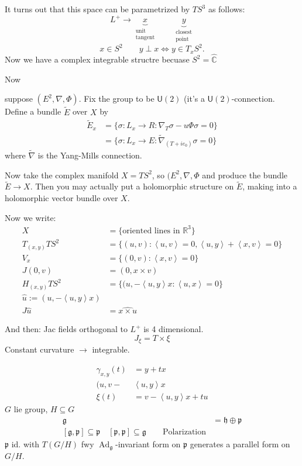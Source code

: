 It turns out that this space can be parametrized by \(TS^3\) as follows:
\[L^+ \to \underbrace{x}_{\substack{\text{unit}  \\ \text{tangent} } }\qquad \underbrace{y}_{\substack{\text{closest}  \\ \text{point} }}\]
\[x \in S^2\qquad y \perp x \iff y \in T_x S^2.\]
Now we have a complex integrable structre becuase \(S^2=\hat{\mathbb{C}}\)

Now

suppose \((E^2, \nabla, \Phi)\). Fix the group to be  \(\mathsf{U}(2)\) (it's a \(\mathsf{U}(2)\)-connection. Define a bundle \(\tilde{E}\) over \(X\) by
\begin{align*}
\tilde{E}_x&= \{ \sigma: L_x \to R: \nabla_T\sigma - u\Phi \sigma=0\}\\
&=\{\sigma:L_x \to E: \tilde{\nabla}_{(T+i e_0)}\sigma=0\}
\end{align*}
where \(\tilde{\nabla}\) is the Yang-Mills connection.

Now take the complex manifold \(X= TS^2\), so \((E^2,\nabla,\Phi\) and produce the bundle \(\tilde{ E} \to X\). Then you may actually put a holomorphic structure on \(\tilde{E}\), making into a holomorphic vector bundle over \(X\).

Now we write:
\begin{align*}
X&=\{\text{oriented lines in \(\mathbb{R}^3\)} \}\\
T_{(x,y)}TS^2&=\{(u,v): \left< u,v\right>=0, \left<u,y\right>+\left<x,v\right>=0\}\\
V_x&=\{(0,v) : \left<x,v\right>=0\}\\
J(0,v)&=(0,x \times v)\\
H_{(x,y)}TS^2&=\{(u,-\left<u,y\right>x:\left<u,x\right>=0\}\\
\hat{u}:=(u,-\left<u,y\right>x)\\
J\hat{u}&=\widehat{x \times u}
\end{align*}

And then: Jac fields orthogonal to \(L^+\) is 4 dimensional.
\[J_{\xi}=T \times \xi\]
Constant curvature \(\to \) integrable.

\begin{align*}
\gamma_{x,y}(t)&=y+t x\\
(u,v-&\left<u,y\right>x\\
\xi(t)&=v-\left<u,y\right>x+tu
\end{align*}
\(G\) lie group, \(H\subseteq G\)
\begin{align*}
\mathfrak{g}&=\mathfrak{h} \oplus  \mathfrak{p}\\
[\mathfrak{g},\mathfrak{p}] \subseteq \mathfrak{p}\quad [\mathfrak{p},\mathfrak{p}] \subseteq \mathfrak{g}\qquad \text{Polarization}
\end{align*}
\(\mathfrak{p}\) id. with \(T(G/H)\) fwy \(\operatorname{Ad}_\mathfrak{g}\)-invariant form on \(\mathfrak{p}\) generates a parallel form on \(G/H\).

